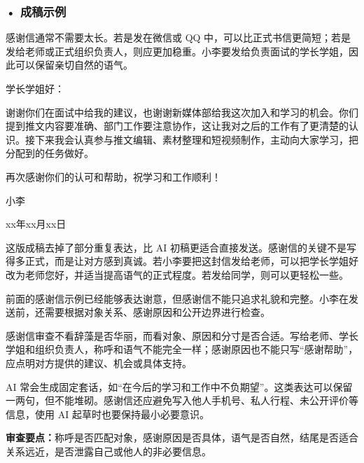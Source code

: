 \subsubsection*{\textbf{• 成稿示例}}

感谢信通常不需要太长。若是发在微信或 QQ 中，可以比正式书信更简短；若是发给老师或正式组织负责人，则应更加稳重。小李要发给负责面试的学长学姐，因此可以保留亲切自然的语气。

\begin{aibox}
\noindent 学长学姐好：

\par\qquad 谢谢你们在面试中给我的建议，也谢谢新媒体部给我这次加入和学习的机会。你们提到推文内容要准确、部门工作要注意协作，这让我对之后的工作有了更清楚的认识。接下来我会认真参与推文编辑、素材整理和短视频制作，主动向大家学习，把分配到的任务做好。

\par\qquad 再次感谢你们的认可和帮助，祝学习和工作顺利！

\par\hfill 小李

\par\hfill xx年xx月xx日
\end{aibox}

这版成稿去掉了部分重复表达，比 AI 初稿更适合直接发送。感谢信的关键不是写得多正式，而是让对方感到真诚。若小李要把这封信发给老师，可以把学长学姐好改为老师您好，并适当提高语气的正式程度。若发给同学，则可以更轻松一些。

前面的感谢信示例已经能够表达谢意，但感谢信不能只追求礼貌和完整。小李在发送前，还需要根据对象关系、感谢原因和公开边界进行检查。

\begin{critiquebox}
感谢信审查不看辞藻是否华丽，而看对象、原因和分寸是否合适。写给老师、学长学姐和组织负责人，称呼和语气不能完全一样；感谢原因也不能只写“感谢帮助”，应点明对方提供的建议、机会或具体支持。

AI 常会生成固定套话，如“在今后的学习和工作中不负期望”。这类表达可以保留一两句，但不能堆砌。感谢信还应避免写入他人手机号、私人行程、未公开评价等信息，使用 AI 起草时也要保持最小必要意识\footnotemark。

\textbf{审查要点：}称呼是否匹配对象，感谢原因是否具体，语气是否自然，结尾是否适合关系远近，是否泄露自己或他人的非必要信息。
\end{critiquebox}
\addtocounter{footnote}{-1}



